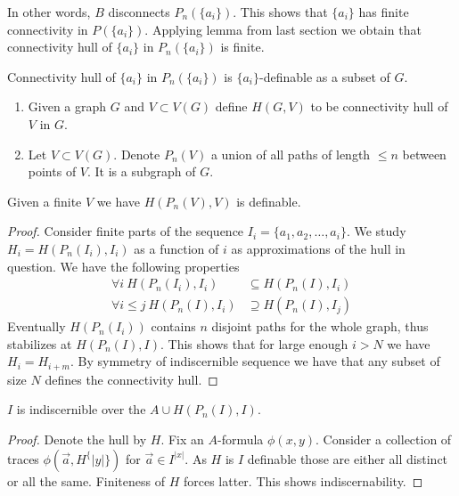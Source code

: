 \documentclass{amsart}
\begin{document}
In other words, $B$ disconnects $P_n(\{a_i\})$. This shows that $\{a_i\}$ has finite connectivity in $P(\{a_i\})$. Applying lemma from last section we obtain that connectivity hull of $\{a_i\}$ in $P_n(\{a_i\})$ is finite.

\begin{Lemma}
	Connectivity hull of $\{a_i\}$ in $P_n(\{a_i\})$ is $\{a_i\}$-definable as a subset of $G$.
\end{Lemma}

\begin{Definition}
	\begin{enumerate}
		\item 	Given a graph $G$ and $V \subset V(G)$ define $H(G, V)$ to be connectivity hull of $V$ in $G$.
		\item   Let $V \subset V(G)$. Denote $P_n(V)$ a union of all paths of length $\leq n$ between points of $V$. It is a subgraph of $G$.
	\end{enumerate}
\end{Definition}

\begin{Note}
	Given a finite $V$ we have $H(P_n(V), V)$ is definable.
\end{Note}

\begin{proof}
	Consider finite parts of the sequence $I_i = \{a_1, a_2, \ldots, a_i\}$. We study $H_i = H(P_n(I_i), I_i)$ as a function of $i$ as approximations of the hull in question. We have the following properties
	\begin{align*}
		 \forall i \ H(P_n(I_i), I_i) &\subseteq H(P_n(I), I_i) \\
		 \forall i \leq j \ H(P_n(I), I_i) &\supseteq H(P_n(I), I_j)
	\end{align*}
		Eventually $H(P_n(I_i))$ contains $n$ disjoint paths for the whole graph, thus stabilizes at $H(P_n(I), I)$. This shows that for large enough $i>N$ we have $H_i = H_{i+m}$. By symmetry of indiscernible sequence we have that any subset of size $N$ defines the connectivity hull.
\end{proof}

\begin{Lemma}
	$I$ is indiscernible over the $A \cup H(P_n(I), I)$.
\end{Lemma}

\begin{proof}
	Denote the hull by $H$. Fix an $A$-formula $\phi(x,y)$. Consider a collection of traces $\phi(\vec a, H^\{|y|\})$ for $\vec a \in I^{|x|}$. As $H$ is $I$ definable those are either all distinct or all the same. Finiteness of $H$ forces latter. This shows indiscernability.
\end{proof}
\end{document}
